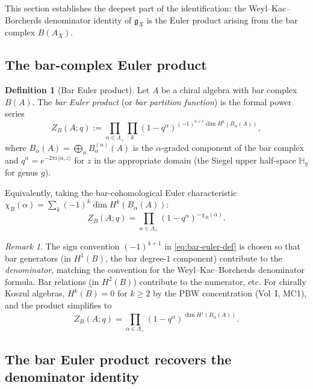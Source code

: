 \documentclass[11pt]{amsart}
\theoremstyle{definition}
\newtheorem{definition}[theorem]{Definition}
\theoremstyle{remark}
\newtheorem{remark}[theorem]{Remark}
\newcommand{\fg}{\mathfrak{g}}
\begin{document}
This section establishes the deepest part of the identification:
the Weyl--Kac--Borcherds denominator identity of $\fg_X$ is
the Euler product arising from the bar complex $B(A_X)$.

\subsection{The bar-complex Euler product}

\begin{definition}[Bar Euler product]
\label{def:bar-euler}
Let $A$ be a chiral algebra with bar complex $B(A)$. The
\emph{bar Euler product} (or \emph{bar partition function}) is
the formal power series
\begin{equation}\label{eq:bar-euler-def}
 Z_B(A; q) := \prod_{\alpha \in \Lambda_+}
 \prod_{k}
 (1 - q^\alpha)^{(-1)^{k+1} \dim H^k(B_\alpha(A))},
\end{equation}
where $B_\alpha(A) = \bigoplus_{n} B^{(n)}_\alpha(A)$ is the
$\alpha$-graded component of the bar complex and $q^\alpha =
e^{-2\pi i \langle \alpha, z \rangle}$ for $z$ in the
appropriate domain (the Siegel upper half-space
$\mathbb{H}_g$ for genus $g$).

Equivalently, taking the bar-cohomological Euler characteristic
$\chi_B(\alpha) = \sum_k (-1)^k \dim H^k(B_\alpha(A))$:
\begin{equation}\label{eq:bar-euler-chi}
 Z_B(A; q) = \prod_{\alpha \in \Lambda_+}
 (1 - q^\alpha)^{-\chi_B(\alpha)}.
\end{equation}
\end{definition}

\begin{remark}
The sign convention $(-1)^{k+1}$ in \eqref{eq:bar-euler-def}
is chosen so that bar generators (in $H^1(B)$, the bar degree-$1$
component) contribute to the \emph{denominator}, matching the
convention for the Weyl--Kac--Borcherds denominator formula.
Bar relations (in $H^2(B)$) contribute to the numerator, etc.
For chirally Koszul algebras, $H^k(B) = 0$ for $k \geq 2$ by
the PBW concentration (Vol~I, MC1), and the product simplifies to
\[
 Z_B(A; q) = \prod_{\alpha \in \Lambda_+}
 (1 - q^\alpha)^{\dim H^1(B_\alpha(A))}.
\]
\end{remark}

\subsection{The bar Euler product recovers the denominator identity}
\end{document}
